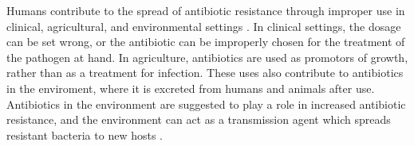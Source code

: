 Humans contribute to the spread of antibiotic resistance through improper use in clinical, agricultural, and environmental settings \cite{ding2023SpreadAntibioticResistance, marston2016AntimicrobialResistance}. 
In clinical settings, the dosage can be set wrong, or the antibiotic can be improperly chosen for the treatment of the pathogen at hand. 
In agriculture, antibiotics are used as promotors of growth, rather than as a treatment for infection.
These uses also contribute to antibiotics in the enviroment, where it is excreted from humans and animals after use.
Antibiotics in the environment are suggested to play a role in increased antibiotic resistance, and the environment can act as a transmission agent which spreads resistant bacteria to new hosts \cite{larsson2022AntibioticResistanceEnvironment}.

